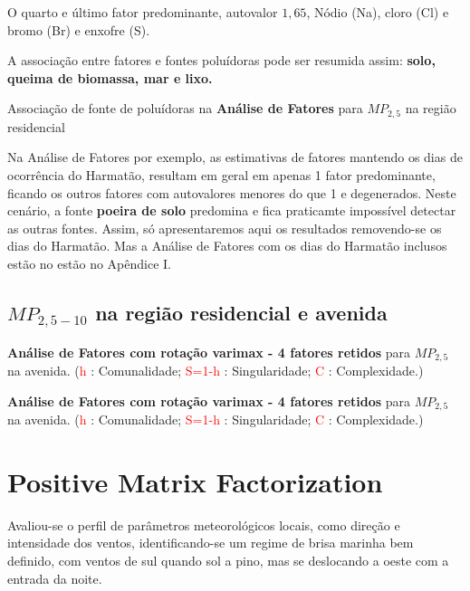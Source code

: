 O quarto e último fator predominante, autovalor $1,65$, 
Nódio (Na), cloro (Cl) e bromo (Br) e enxofre (S).

A associação entre fatores e fontes poluídoras pode ser resumida
assim: \textbf{solo, queima de biomassa, mar e lixo.}

\begin{table}[H]
  \centering
  \caption{Associação de fonte de poluídoras na \textbf{Análise de Fatores}
         para $MP_{2,5}$ na região residencial}
  
\end{table}

Na Análise de Fatores por exemplo, as estimativas de fatores 
mantendo os dias de ocorrência do Harmatão, resultam em geral em apenas 
1 fator predominante, ficando os outros fatores com autovalores
menores do que 1 e degenerados. Neste cenário, a fonte 
\textbf{poeira de solo} predomina e fica praticamte impossível
detectar as outras fontes. Assim, só apresentaremos aqui os resultados 
removendo-se os dias do Harmatão. Mas a Análise de Fatores com os
dias do Harmatão inclusos estão no estão no Apêndice I.

\subsection{$MP_{2,5-10}$ na região residencial e avenida}

\begin{table}[H]
  \caption{\textbf{Análise de Fatores com rotação varimax - 4 fatores retidos} 
             para $MP_{2,5}$ na avenida.
           (\textcolor{red}{h} : Comunalidade; 
           \textcolor{red}{S=1-h} : Singularidade; 
           \textcolor{red}{C} : Complexidade.)}
  
\end{table}

\begin{table}[H]
  \caption{\textbf{Análise de Fatores com rotação varimax - 4 fatores retidos} 
             para $MP_{2,5}$ na avenida.
           (\textcolor{red}{h} : Comunalidade; 
           \textcolor{red}{S=1-h} : Singularidade; 
           \textcolor{red}{C} : Complexidade.)}
  
\end{table}

\section{Positive Matrix Factorization}
Avaliou-se o perfil de parâmetros meteorológicos locais, como direção e intensidade dos ventos, 
identificando-se um regime de brisa marinha bem definido, com ventos de sul quando sol a pino, mas se deslocando a oeste com a entrada da noite. 

